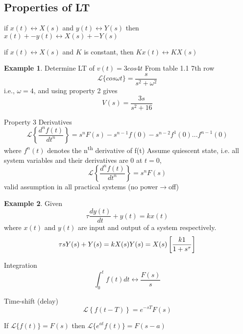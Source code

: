 \documentclass[11pt]{article} %
\theoremstyle{definition}
\newtheorem{example}{Example}[subsection]
\begin{document}
\subsection{Properties of LT}
	\begin{description}
		\item[Property 1] if $x(t)\leftrightarrow X(s)$ and $y(t)\leftrightarrow Y(s)$ then $x(t)+-y(t) \leftrightarrow X(s)+- Y(s)$
		\item[Property 2] if $x(t)\leftrightarrow X(s)$  and $K$ is constant, then $Kx(t)\leftrightarrow KX(s)$

\begin{example}
		Determine LT of $v(t) = 3cos4t$
		From table 1.1 7th row
			\begin{equation}
				\mathcal{L}\{cos\omega t\} = \frac{s}{s^2+\omega^2}
			\end{equation}
		i.e., $\omega=4$, and using property 2 gives
			\begin{equation}
				 V(s) =  \frac{3s}{s^2+16}
			\end{equation}
		\item[Property 3] Derivatives
			\begin{equation}
				\mathcal{L}\left\{\frac{d^nf(t)}{dt^n}\right\} = s^n  F(s) -s^{n-1}f(0)-s^{n-2}f^1(0)  ...  f^{n-1}(0)
			\end{equation}
			where $f^n(t)$ denotes the n\textsuperscript{th} derivative of f(t)
		Assume quiescent state, i.e. all system variables and their derivatives are 0 at $t=0$,
			\begin{equation}
				\mathcal{L}\left\{\frac{d^nf(t)}{dt^n}\right\}  = s^nF(s)
			\end{equation}
		valid assumption in all practical systems (no power$\rightarrow$off)
\end{example}
\begin{example}	
			Given $$\tau \frac{dy(t)}{dt}+y(t) = kx(t)$$  where $x(t)$ and $y(t)$ are input and output of a system respectively.
			\begin{equation}
				\tau s Y(s) + Y(s) = kX(s) \\
				Y(s) = X(s)\left[\frac{k1}{1+s^\tau }\right]
			\end{equation}
\end{example}
		\item[Property 4] Integration
			\begin{equation}
				\int^t_0f(t)dt\leftrightarrow \frac{F(s)}{s}
			\end{equation}

		\item[Property 5] Time-shift (delay)
			\begin{equation}
				\mathcal{L}\left\{f(t-T)\right\}=e^{-sT}F(s)
			\end{equation}
		\item[Property 6]
			If $\mathcal{L}\{f(t)\}=F(s)$
			then $\mathcal{L}\{e^{at}f(t)\} = F(s-a)$
	\end{description}
\end{document}
